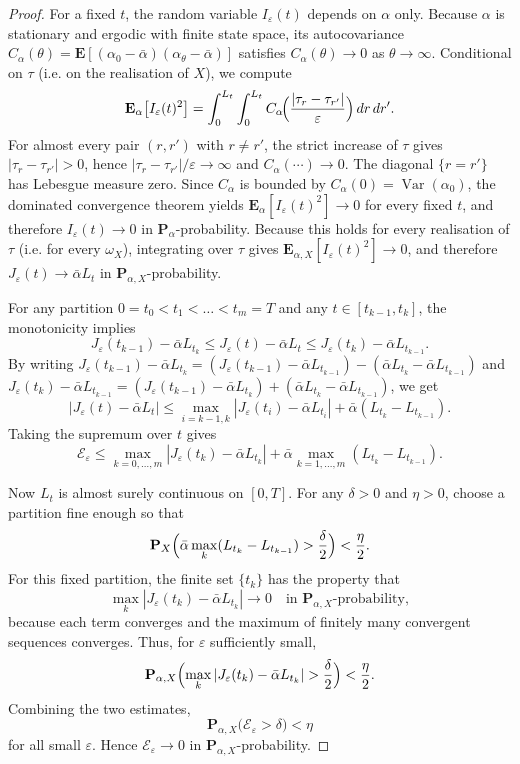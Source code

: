 \documentclass[11pt]{amsart}
\theoremstyle{plain}
\theoremstyle{definition}
\theoremstyle{remark}
\begin{document}
\begin{proof}
	For a fixed $t$, the random variable $I_\varepsilon(t)$ depends on $\alpha$ only.
	Because $\alpha$ is stationary and ergodic with finite state space,
	its autocovariance $C_\alpha(\theta)=\mathbf E[(\alpha_0-\bar\alpha)(\alpha_\theta-\bar\alpha)]$
	satisfies $C_\alpha(\theta)\to0$ as $\theta\to\infty$.
	Conditional on $\tau$ (i.e. on the realisation of $X$), we compute
	\[
	\mathbf E_\alpha\bigl[I_\varepsilon(t)^2\bigr]
	= \int_0^{L_t}\int_0^{L_t} C_\alpha\!\Bigl(\frac{|\tau_r-\tau_{r'}|}{\varepsilon}\Bigr)\,dr\,dr'.
	\]
	For almost every pair $(r,r')$ with $r\neq r'$, the strict increase of $\tau$ gives $|\tau_r-\tau_{r'}|>0$,
	hence $|\tau_r-\tau_{r'}|/\varepsilon\to\infty$ and $C_\alpha(\cdots)\to0$.
	The diagonal $\{r=r'\}$ has Lebesgue measure zero.
	Since $C_\alpha$ is bounded by $C_\alpha(0)=\operatorname{Var}(\alpha_0)$,
	the dominated convergence theorem yields $\mathbf E_\alpha[I_\varepsilon(t)^2]\to0$ for every fixed $t$,
	and therefore $I_\varepsilon(t)\to0$ in $\mathbf P_\alpha$-probability.
	Because this holds for every realisation of $\tau$ (i.e. for every $\omega_X$), integrating over $\tau$ gives $\mathbf E_{\alpha,X}[I_\varepsilon(t)^2]\to0$, and therefore $J_\varepsilon(t)\to\bar\alpha L_t$ in $\mathbf P_{\alpha,X}$-probability.
	
	For any partition $0=t_0<t_1<\dots<t_m=T$ and any $t\in[t_{k-1},t_k]$,
	the monotonicity implies
	\[
	J_\varepsilon(t_{k-1})-\bar\alpha L_{t_k}\le J_\varepsilon(t)-\bar\alpha L_t\le
	J_\varepsilon(t_k)-\bar\alpha L_{t_{k-1}}.
	\]
	By writing \(J_\varepsilon(t_{k-1})-\bar\alpha L_{t_k} = (J_\varepsilon(t_{k-1})-\bar\alpha L_{t_{k-1}}) - (\bar\alpha L_{t_{k}}-\bar\alpha L_{t_{k-1}}) \) and \(J_\varepsilon(t_{k})-\bar\alpha L_{t_{k-1}} = (J_\varepsilon(t_{k-1})-\bar\alpha L_{t_{k}}) + (\bar\alpha L_{t_{k}}-\bar\alpha L_{t_{k-1}}) \), we get
	\[
	|J_\varepsilon(t)-\bar\alpha L_t|\le \max_{i=k-1,k}|J_\varepsilon(t_i)-\bar\alpha L_{t_i}|
	+\bar\alpha(L_{t_k}-L_{t_{k-1}}).
	\]
	Taking the supremum over $t$ gives
	\[
	\mathcal E_\varepsilon \le \max_{k=0,\dots,m}|J_\varepsilon(t_k)-\bar\alpha L_{t_k}|
	+ \bar\alpha\max_{k=1,\dots,m}(L_{t_k}-L_{t_{k-1}}).
	\]
	
	Now $L_t$ is almost surely continuous on $[0,T]$.
	For any $\delta>0$ and $\eta>0$, choose a partition fine enough so that
	\[
	\mathbf P_X\Bigl(\bar\alpha\max_k(L_{t_k}-L_{t_{k-1}})>\frac{\delta}{2}\Bigr)<\frac{\eta}{2}.
	\]
	For this fixed partition, the finite set $\{t_k\}$ has the property that
	\[
	\max_k|J_\varepsilon(t_k)-\bar\alpha L_{t_k}|\to0\quad\text{in }\mathbf P_{\alpha,X}\text{-probability},
	\]
	because each term converges and the maximum of finitely many convergent sequences converges.
	Thus, for $\varepsilon$ sufficiently small,
	\[
	\mathbf P_{\alpha,X}\Bigl(\max_k|J_\varepsilon(t_k)-\bar\alpha L_{t_k}|>\frac{\delta}{2}\Bigr)<\frac{\eta}{2}.
	\]
	Combining the two estimates,
	\[
	\mathbf P_{\alpha,X}\bigl(\mathcal E_\varepsilon>\delta\bigr)<\eta
	\]
	for all small $\varepsilon$. Hence $\mathcal E_\varepsilon\to0$ in $\mathbf P_{\alpha,X}$-probability.
	

\end{proof}
\end{document}
